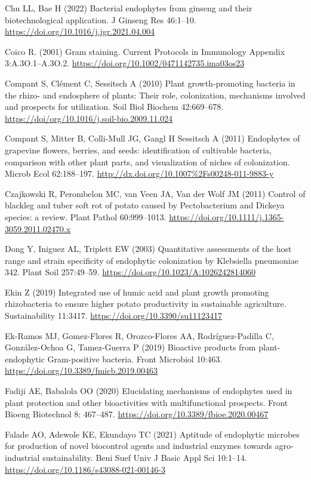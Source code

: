 \documentclass[sn-mathphys,Numbered]{sn-jnl}%
\theoremstyle{thmstyleone}%
\theoremstyle{thmstyletwo}%
\theoremstyle{thmstylethree}%
\begin{document}
Chu LL, Bae H (2022) Bacterial endophytes from ginseng and their biotechnological application. J Ginseng Res 46:1–10. \url{https://doi.org/10.1016/j.jgr.2021.04.004}

Coico R. (2001) Gram staining. Current Protocols in Immunology Appendix 3:A.3O.1–A.3O.2. \url{https://doi.org/10.1002/0471142735.ima03os23}

Compant S, Clément C, Sessitsch A (2010) Plant growth-promoting bacteria in the rhizo- and endosphere of plants: Their role, colonization, mechanisms involved and prospects for utilization. Soil Biol Biochem  42:669–678. 
\url{https://doi/org/10.1016/j.soil-bio.2009.11.024}

Compant S, Mitter B, Colli-Mull JG, Gangl H Sessitsch A (2011) Endophytes of grapevine flowers, berries, and seeds: identification of cultivable bacteria, comparison with other plant parts, and visualization of niches of colonization. Microb Ecol 62:188–197. \url{http://dx.doi.org/10.1007%2Fs00248-011-9883-y}

Czajkowski R, Perombelon MC, van Veen JA, Van der Wolf JM (2011) Control of blackleg and tuber soft rot of potato caused by Pectobacterium and Dickeya species: a review. Plant Pathol 60:999–1013. \url{https://doi.org/10.1111/j.1365-3059.2011.02470.x}

Dong Y, Iniguez AL, Triplett EW (2003) Quantitative assessments of the host range and strain specificity of endophytic colonization by Klebsiella pneumoniae 342. Plant Soil 257:49–59. \url{https://doi.org/10.1023/A:1026242814060}

Ekin Z (2019) Integrated use of humic acid and plant growth promoting rhizobacteria to ensure higher potato productivity in sustainable agriculture. Sustainability 11:3417. \url{https://doi.org/10.3390/su11123417}

Ek-Ramos MJ, Gomez-Flores R, Orozco-Flores AA, Rodríguez-Padilla C, González-Ochoa G, Tamez-Guerra P (2019) Bioactive products from plant-endophytic Gram-positive bacteria. Front Microbiol 10:463. \url{https://doi.org/10.3389/fmicb.2019.00463}

Fadiji AE, Babalola OO (2020) Elucidating mechanisms of endophytes used in plant protection and other bioactivities with multifunctional prospects. Front Bioeng Biotechnol 8: 467–487. \url{https://doi.org/10.3389/fbioe.2020.00467}

Falade AO, Adewole KE, Ekundayo TC (2021) Aptitude of endophytic microbes for production of novel biocontrol agents and industrial enzymes towards agro-industrial sustainability. Beni Suef Univ J Basic Appl Sci 10:1–14. \url{https://doi.org/10.1186/s43088-021-00146-3}
\end{document}
